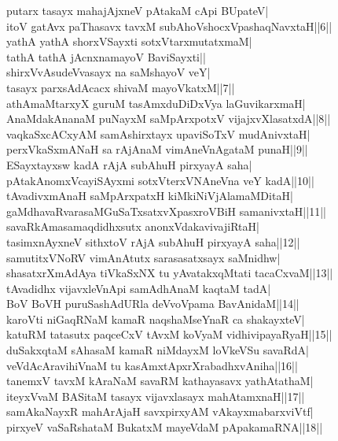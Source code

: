 \documentclass{article}
\begin{document}
putarx tasayx mahajAjxneV pAtakaM cApi BUpateV|\\
itoV gatAvx paThasavx tavxM subAhoVshocxVpashaqNavxtaH||6||\\
yathA yathA shorxVSayxti sotxVtarxmutatxmaM|\\
tathA tathA jAcnxnamayoV BaviSayxti||\\
shirxVvAsudeVvasayx na saMshayoV veY|\\
tasayx parxsAdAcacx shivaM mayoVkatxM||7||\\
athAmaMtarxyX guruM tasAmxduDiDxVya laGuvikarxmaH|\\
AnaMdakAnanaM puNayxM saMpArxpotxV vijajxvXlasatxdA||8||\\
vaqkaSxcACxyAM samAshirxtayx upaviSoTxV mudAnivxtaH|\\
perxVkaSxmANaH sa rAjAnaM vimAneVnAgataM punaH||9||\\
ESayxtayxsw kadA rAjA subAhuH pirxyayA saha|\\
pAtakAnomxVcayiSAyxmi sotxVterxVNAneVna veY kadA||10||\\
tAvadivxmAnaH saMpArxpatxH kiMkiNiVjAlamaMDitaH|\\
gaMdhavaRvarasaMGuSaTxsatxvXpasxroVBiH samanivxtaH||11||\\
savaRkAmasamaqdidhxsutx anonxVdakavivajiRtaH|\\
tasimxnAyxneV sithxtoV rAjA subAhuH pirxyayA saha||12||\\
samutitxVNoRV vimAnAtutx sarasasatxsayx saMnidhw|\\
shasatxrXmAdAya tiVkaSxNX tu yAvatakxqMtati tacaCxvaM||13||\\
tAvadidhx vijavxleVnApi samAdhAnaM kaqtaM tadA|\\
BoV BoVH puruSashAdURla deVvoVpama BavAnidaM||14||\\
karoVti niGaqRNaM kamaR naqshaMseYnaR ca shakayxteV|\\
katuRM tatasutx paqceCxV tAvxM koVyaM vidhivipayaRyaH||15||\\
duSakxqtaM sAhasaM kamaR niMdayxM loVkeVSu savaRdA|\\
veVdAcAravihiVnaM tu kasAmxtApxrXrabadhxvAniha||16||\\
tanemxV tavxM kAraNaM savaRM kathayasavx yathAtathaM|\\
iteyxVvaM BASitaM tasayx vijavxlasayx mahAtamxnaH||17||\\
samAkaNayxR mahArAjaH savxpirxyAM vAkayxmabarxviVtf|\\
pirxyeV vaSaRshataM BukatxM mayeVdaM pApakamaRNA||18||\\
\end{document}
